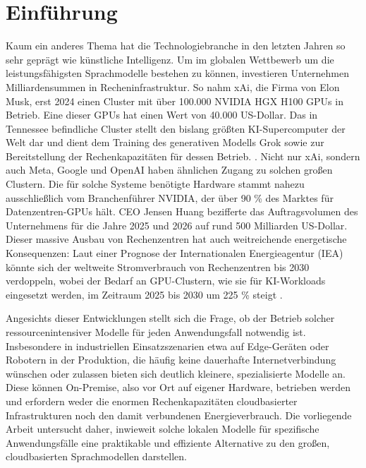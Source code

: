 \chapter{Einführung}

Kaum ein anderes Thema hat die Technologiebranche in den letzten Jahren so sehr geprägt wie künstliche Intelligenz.
Um im globalen Wettbewerb um die leistungsfähigsten Sprachmodelle bestehen zu können, investieren Unternehmen Milliardensummen in Recheninfrastruktur.
So nahm xAi, die Firma von Elon Musk, erst 2024 einen Cluster mit über 100.000 NVIDIA HGX H100 GPUs in Betrieb. Eine dieser GPUs hat einen Wert  von 40.000 US-Dollar. Das in Tennessee befindliche Cluster stellt den bislang größten KI-Supercomputer der Welt dar und dient dem Training des generativen Modells Grok sowie zur Bereitstellung der Rechenkapazitäten für dessen Betrieb. \cite{brendel2025colossus}.
Nicht nur xAi, sondern auch Meta, Google und OpenAI haben ähnlichen Zugang zu solchen großen Clustern.
Die für solche Systeme benötigte Hardware stammt nahezu ausschließlich vom Branchenführer NVIDIA, der über 90 \% des Marktes für Datenzentren-GPUs hält.
CEO Jensen Huang bezifferte das Auftragsvolumen des Unternehmens für die Jahre 2025 und 2026 auf rund 500 Milliarden US-Dollar. \cite{leswing2025nvidia}
Dieser massive Ausbau von Rechenzentren hat auch weitreichende energetische Konsequenzen:
Laut einer Prognose der Internationalen Energieagentur (IEA) könnte sich der weltweite Stromverbrauch von Rechenzentren bis 2030 verdoppeln, wobei der Bedarf an GPU-Clustern, wie sie für KI-Workloads eingesetzt werden, im Zeitraum 2025 bis 2030 um 225 \% steigt \cite{janson2025rechenzentren}.

Angesichts dieser Entwicklungen stellt sich die Frage, ob der Betrieb solcher ressourcenintensiver Modelle für jeden Anwendungsfall notwendig ist.
Insbesondere in industriellen Einsatzszenarien etwa auf Edge-Geräten oder Robotern in der Produktion, die häufig keine dauerhafte Internetverbindung wünschen oder zulassen bieten sich deutlich kleinere, spezialisierte Modelle an.
Diese können On-Premise, also vor Ort auf eigener Hardware, betrieben werden und erfordern weder die enormen Rechenkapazitäten cloudbasierter Infrastrukturen noch den damit verbundenen Energieverbrauch.
Die vorliegende Arbeit untersucht daher, inwieweit solche lokalen Modelle für spezifische Anwendungsfälle eine praktikable und effiziente Alternative zu den großen, cloudbasierten Sprachmodellen darstellen.

